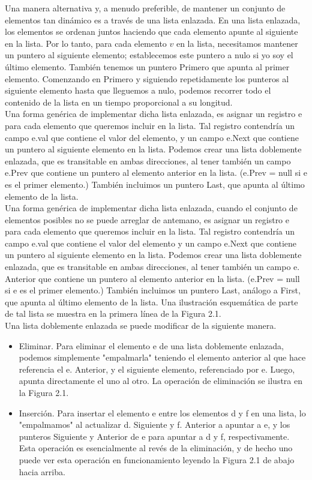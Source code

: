 \documentclass[a4paper]{article}
\begin{document}
Una manera alternativa y, a menudo preferible, de mantener un conjunto de elementos tan dinámico es a través de una lista enlazada. En una lista enlazada, los elementos se ordenan juntos haciendo que cada elemento apunte al siguiente en la lista. Por lo tanto, para cada elemento $v$ en la lista, necesitamos mantener un puntero al siguiente elemento; establecemos este puntero a nulo si yo soy el último elemento. También tenemos un puntero Primero que apunta al primer elemento. Comenzando en Primero y siguiendo repetidamente los punteros al siguiente elemento hasta que lleguemos a nulo, podemos recorrer todo el contenido de la lista en un tiempo proporcional a su longitud. \\

Una forma genérica de implementar dicha lista enlazada, es asignar un registro e para cada elemento que queremos incluir en la lista. Tal registro contendría un campo e.val que contiene el valor del elemento, y un campo e.Next que contiene un puntero al siguiente elemento en la lista. Podemos crear una lista doblemente enlazada, que es transitable en ambas direcciones, al tener también un campo e.Prev que contiene un puntero al elemento anterior en la lista. (e.Prev = null si e es el primer elemento.) También incluimos un puntero Last, que apunta al último elemento de la lista.\\ 

Una forma genérica de implementar dicha lista enlazada, cuando el conjunto de elementos posibles no se puede arreglar de antemano, es asignar un registro e para cada elemento que queremos incluir en la lista. Tal registro contendría un campo e.val que contiene el valor del elemento y un campo e.Next que contiene un puntero al siguiente elemento en la lista. Podemos crear una lista doblemente enlazada, que es transitable en ambas direcciones, al tener también un campo e. Anterior que contiene un puntero al elemento anterior en la lista. (e.Prev = null si e es el primer elemento.) También incluimos un puntero Last, análogo a First, que apunta al último elemento de la lista. Una ilustración esquemática de parte de tal lista se muestra en la primera línea de la Figura 2.1.\\

Una lista doblemente enlazada se puede modificar de la siguiente manera.

\begin{itemize}
 \item Eliminar. Para eliminar el elemento e de una lista doblemente enlazada, podemos simplemente "empalmarla" teniendo el elemento anterior al que hace referencia el e. Anterior, y el siguiente elemento, referenciado por e. Luego, apunta directamente el uno al otro. La operación de eliminación se ilustra en la Figura 2.1.
  \item Inserción. Para insertar el elemento e entre los elementos d y f en una lista, lo "empalmamos" al actualizar d. Siguiente y f. Anterior a apuntar a e, y los punteros Siguiente y Anterior de e para apuntar a d y f, respectivamente. Esta operación es esencialmente al revés de la eliminación, y de hecho uno puede ver esta operación en funcionamiento leyendo la Figura 2.1 de abajo hacia arriba. 
\end{itemize}
\end{document}
